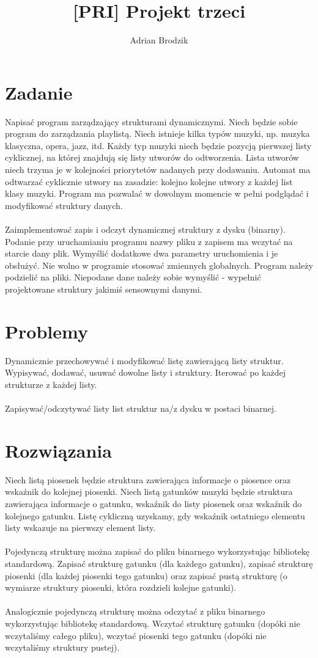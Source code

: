 \documentclass[a4paper, 12pt]{article}
\title{\bf [PRI] Projekt trzeci}
\author{Adrian Brodzik}
\begin{document}
\maketitle

\section*{Zadanie}
Napisać program zarządzający strukturami dynamicznymi. Niech będzie sobie program do zarządzania playlistą. Niech istnieje kilka typów muzyki, np. muzyka klasyczna, opera, jazz, itd. Każdy typ muzyki niech będzie pozycją pierwszej listy cyklicznej, na której znajdują się listy utworów do odtworzenia. Lista utworów niech trzyma je w kolejności priorytetów nadanych przy dodawaniu. Automat ma odtwarzać cyklicznie utwory na zasadzie: kolejno kolejne utwory z każdej list klasy muzyki. Program ma pozwalać w dowolnym momencie w pełni podglądać i modyfikować struktury danych.
\\\\
Zaimplementować zapis i odczyt dynamicznej struktury z dysku (binarny). Podanie przy uruchamianiu programu nazwy pliku z zapisem ma wczytać na starcie dany plik. Wymyślić dodatkowe dwa parametry uruchomienia i je obsłużyć. Nie wolno w programie stosować zmiennych globalnych. Program należy podzielić na pliki. Niepodane dane należy sobie wymyślić - wypełnić projektowane struktury jakimiś sensownymi danymi.

\section*{Problemy}
Dynamicznie przechowywać i modyfikować listę zawierającą listy struktur. Wypisywać, dodawać, usuwać dowolne listy i struktury. Iterować po każdej strukturze z każdej listy.
\\\\
Zapisywać/odczytywać listy list struktur na/z dysku w postaci binarnej.

\section*{Rozwiązania}
Niech listą piosenek będzie struktura zawierająca informacje o piosence oraz wskaźnik do kolejnej piosenki. Niech listą gatunków muzyki będzie struktura zawierająca informacje o gatunku, wskaźnik do listy piosenek oraz wskaźnik do kolejnego gatunku. Listę cykliczną uzyskamy, gdy wskaźnik ostatniego elementu listy wskazuje na pierwszy element listy.
\\\\
Pojedynczą strukturę można zapisać do pliku binarnego wykorzystując bibliotekę standardową. Zapisać strukturę gatunku (dla każdego gatunku), zapisać strukturę piosenki (dla każdej piosenki tego gatunku) oraz zapisać pustą strukturę (o wymiarze struktury piosenki, która rozdzieli kolejne gatunki).
\\\\
Analogicznie pojedynczą strukturę można odczytać z pliku binarnego wykorzystując bibliotekę standardową. Wczytać strukturę gatunku (dopóki nie wczytaliśmy całego pliku), wczytać piosenki tego gatunku (dopóki nie wczytaliśmy struktury pustej).
\end{document}
